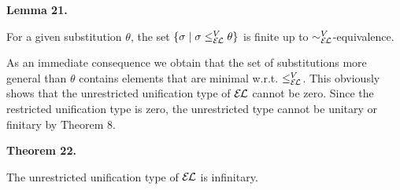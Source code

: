 \documentclass[10pt,a4paper]{amsart}
\begin{document}
 
 
\par\medskip\noindent\textbf{Lemma 21.}\par
 
 
For a given substitution $\theta$, the set $\{\sigma\mid\sigma\leq_{\mathcal{E\mkern-1.618muL}}^{V}\theta\}$ is finite up to $\sim_{\mathcal{E\mkern-1.618muL}}^{V}$-equivalence.\par
 
 
 
 
As an immediate consequence we obtain that the set of substitutions more general than $\theta$ contains elements that are minimal w.r.t. $\leq_{\mathcal{E\mkern-1.618muL}}^{V}$. This obviously shows that the unrestricted unification type of $\mathcal{E\mkern-1.618muL}$ cannot be zero. Since the restricted unification type is zero, the unrestricted type cannot be unitary or finitary by Theorem 8.\par
 

 
\par\medskip\noindent\textbf{Theorem 22.}\par
 
 
The unrestricted unification type of $\mathcal{E\mkern-1.618muL}$ is infinitary.\par
 
 
\end{document}
